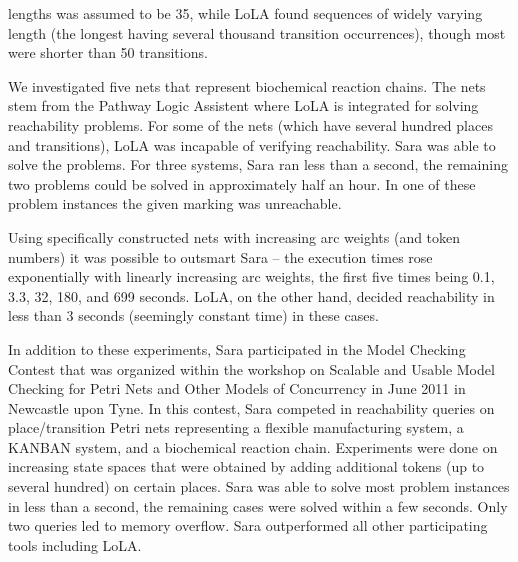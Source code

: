 \documentclass{LMCS}
\begin{document}
\begin{iteMize}{}
lengths was assumed to be 35, while LoLA found sequences of widely varying length (the longest having several thousand transition occurrences), though most
were shorter than 50 transitions.
\item We investigated five nets that represent biochemical reaction chains. The nets stem from the Pathway Logic Assistent \cite{talcottdill} where LoLA
is integrated for solving reachability problems. For some of the nets (which have several hundred places and transitions), LoLA was incapable of
verifying reachability. Sara was able to solve the problems. For three systems, Sara ran less than a second, the remaining two problems
could be solved in approximately half an hour. In one of these problem instances the given marking was unreachable.
\item Using specifically constructed nets with increasing arc weights (and token numbers) it was possible to outsmart
Sara -- the execution times rose exponentially with linearly increasing arc weights, the first five
times being 0.1, 3.3, 32, 180, and 699 seconds. LoLA, on the other hand,
decided reachability in less than 3 seconds (seemingly constant time) in these cases.
\end{iteMize}\smallskip

\noindent In addition to these experiments, Sara participated in the Model Checking Contest \cite{mcc} that was organized within the workshop on
Scalable and Usable Model Checking for Petri Nets and Other Models of Concurrency in June 2011 in Newcastle upon Tyne.
In this contest, Sara competed in reachability queries on place/transition Petri nets representing a flexible manufacturing system,
a KANBAN system, and a biochemical reaction chain. Experiments were done on increasing state spaces that were obtained by adding
additional tokens (up to several hundred) on certain places. Sara was able to solve most problem instances in less than a second, the remaining cases
were solved within a few seconds. Only two queries led to memory overflow. Sara outperformed all other participating tools including LoLA.
\end{document}
